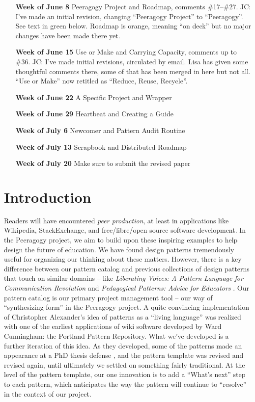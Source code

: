 \begin{itemize}
\item[{\bf Week of June 8}] Peeragogy Project and Roadmap, comments \#17--\#27.  JC: I've made an initial revision, changing ``Peeragogy Project'' to ``Peeragogy''.  See text in green below.  Roadmap is orange, meaning ``on deck'' but no major changes have been made there yet.
\item[{\bf Week of June 15}] Use or Make and Carrying Capacity, comments up to \#36.  JC: I've made initial revisions, circulated by email.  Lisa has given some thoughtful comments there, some of that has been merged in here but not all. ``Use or Make'' now retitled as ``Reduce, Reuse, Recycle''.
\item[{\bf Week of June 22}] A Specific Project and Wrapper
\item[{\bf Week of June 29}] Heartbeat and Creating a Guide
\item[{\bf Week of July 6}] Newcomer and Pattern Audit Routine
\item[{\bf Week of July 13}] Scrapbook and Distributed Roadmap
\item[{\bf Week of July 20}] Make sure to submit the revised paper
\end{itemize}

\section{Introduction}\label{sec:Introduction}

Readers will have encountered \emph{peer production}, at least in applications like Wikipedia, StackExchange, and free/libre/open source software development.   In the Peeragogy project,  we aim to build upon these inspiring examples to help design the future of education.  
We have found design patterns tremendously useful for organizing our thinking about these matters.  However, there is a key difference between our pattern catalog and previous collections of design patterns that touch on similar domains -- like \emph{Liberating Voices: A Pattern Language for Communication Revolution} \cite{schuler2008liberating} and \emph{Pedagogical Patterns: Advice for Educators} \cite{bergin2012pedagogical}.  Our pattern catalog is our primary project management tool -- our way of ``synthesizing form'' \cite{alexander1964notes} in the Peeragogy project. A quite convincing implementation of Christopher Alexander’s idea of patterns as a ``living language'' \cite[p.~xvii]{alexander1977pattern} was realized with one of the earliest applications of wiki software developed by Ward Cunningham: the Portland Pattern Repository.  What we've developed is a further iteration of this idea.   As they developed, some of the patterns made an appearance at a PhD thesis defense \cite{corneli-thesis}, and the pattern template was revised and revised again, until ultimately we settled on something fairly traditional.  At the level of the pattern template, our one innovation is to add a ``What's next'' step to each pattern, which anticipates the way the pattern will continue to ``resolve'' in the context of our project. 

